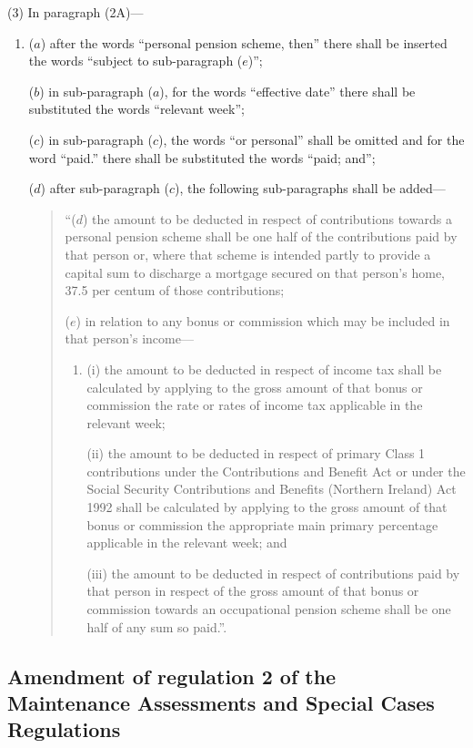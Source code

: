 \documentclass[12pt,a4paper]{article}
\begin{document}
(3) In paragraph (2A)—
\begin{enumerate}\item[]
($a$) after the words “personal pension scheme, then” there shall be inserted the words “subject to sub-paragraph ($e$)”;

($b$) in sub-paragraph ($a$), for the words “effective date” there shall be substituted the words “relevant week”;

($c$) in sub-paragraph ($c$), the words “or personal” shall be omitted and for the word “paid.” there shall be substituted the words “paid; and”;

($d$) after sub-paragraph ($c$), the following sub-paragraphs shall be added—
\begin{quotation}
“($d$) the amount to be deducted in respect of contributions towards a personal pension scheme shall be one half of the contributions paid by that person or, where that scheme is intended partly to provide a capital sum to discharge a mortgage secured on that person’s home, 37.5 per centum of those contributions;

($e$) in relation to any bonus or commission which may be included in that person’s income—
\begin{enumerate}\item[]
(i) the amount to be deducted in respect of income tax shall be calculated by applying to the gross amount of that bonus or commission the rate or rates of income tax applicable in the relevant week;

(ii) the amount to be deducted in respect of primary Class 1 contributions under the Contributions and Benefit Act or under the Social Security Contributions and Benefits (Northern Ireland) Act 1992 shall be calculated by applying to the gross amount of that bonus or commission the appropriate main primary percentage applicable in the relevant week; and

(iii) the amount to be deducted in respect of contributions paid by that person in respect of the gross amount of that bonus or commission towards an occupational pension scheme shall be one half of any sum so paid.”.
\end{enumerate}
\end{quotation}
\end{enumerate}

\subsection[42. Amendment of regulation 2 of the Maintenance Assessments and Special Cases Regulations]{\sloppy Amendment of regulation 2 of the Maintenance Assessments and Special Cases Regulations}
\end{document}
